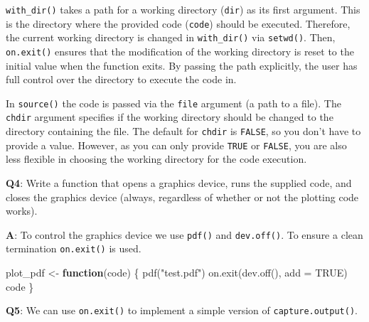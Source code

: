 \documentclass[
]{krantz}
\makeatletter
\newenvironment{Shaded}{\begin{snugshade}}{\end{snugshade}}
\newcommand{\ControlFlowTok}[1]{\textcolor[rgb]{0.13,0.29,0.53}{\textbf{#1}}}
\newcommand{\DataTypeTok}[1]{\textcolor[rgb]{0.13,0.29,0.53}{#1}}
\newcommand{\KeywordTok}[1]{\textcolor[rgb]{0.13,0.29,0.53}{\textbf{#1}}}
\newcommand{\NormalTok}[1]{#1}
\newcommand{\OtherTok}[1]{\textcolor[rgb]{0.56,0.35,0.01}{#1}}
\newcommand{\StringTok}[1]{\textcolor[rgb]{0.31,0.60,0.02}{#1}}
\newenvironment{kframe}{%
\medskip{}
\setlength{\fboxsep}{.8em}
 \def\at@end@of@kframe{}%
 \ifinner\ifhmode%
  \def\at@end@of@kframe{\end{minipage}}%
  \begin{minipage}{\columnwidth}%
 \fi\fi%
 \def\FrameCommand##1{\hskip\@totalleftmargin \hskip-\fboxsep
 \colorbox{shadecolor}{##1}\hskip-\fboxsep
     \hskip-\linewidth \hskip-\@totalleftmargin \hskip\columnwidth}%
 \MakeFramed {\advance\hsize-\width
   \@totalleftmargin\z@ \linewidth\hsize
   \@setminipage}}%
 {\par\unskip\endMakeFramed%
 \at@end@of@kframe}
\renewenvironment{Shaded}{\begin{kframe}}{\end{kframe}}
\renewcommand{\KeywordTok} [1]{\textcolor[rgb]{0.00,0.44,0.13}{{#1}}}
\renewcommand{\DataTypeTok}[1]{\textcolor[rgb]{0.56,0.13,0.00}{{#1}}}
\renewcommand{\StringTok}  [1]{\textcolor[rgb]{0.25,0.44,0.63}{{#1}}}
\renewcommand{\OtherTok}   [1]{\textcolor[rgb]{0.00,0.44,0.13}{{#1}}}
\renewcommand{\NormalTok}  [1]{{#1}}
\makeatother
\begin{document}
\texttt{with\_dir()} takes a path for a working directory (\texttt{dir}) as its first argument. This is the directory where the provided code (\texttt{code}) should be executed. Therefore, the current working directory is changed in \texttt{with\_dir()} via \texttt{setwd()}. Then, \texttt{on.exit()} ensures that the modification of the working directory is reset to the initial value when the function exits. By passing the path explicitly, the user has full control over the directory to execute the code in.

In \texttt{source()} the code is passed via the \texttt{file} argument (a path to a file). The \texttt{chdir} argument specifies if the working directory should be changed to the directory containing the file. The default for \texttt{chdir} is \texttt{FALSE}, so you don't have to provide a value. However, as you can only provide \texttt{TRUE} or \texttt{FALSE}, you are also less flexible in choosing the working directory for the code execution.

\textbf{{Q4}}: Write a function that opens a graphics device, runs the supplied code, and closes the graphics device (always, regardless of whether or not the plotting code works).

\textbf{{A}}: To control the graphics device we use \texttt{pdf()} and \texttt{dev.off()}. To ensure a clean termination \texttt{on.exit()} is used.

\begin{Shaded}
\begin{Highlighting}[]
\NormalTok{plot_pdf <-}\StringTok{ }\ControlFlowTok{function}\NormalTok{(code) \{}
  \KeywordTok{pdf}\NormalTok{(}\StringTok{"test.pdf"}\NormalTok{)}
  \KeywordTok{on.exit}\NormalTok{(}\KeywordTok{dev.off}\NormalTok{(), }\DataTypeTok{add =} \OtherTok{TRUE}\NormalTok{)}
\NormalTok{  code}
\NormalTok{\}}
\end{Highlighting}
\end{Shaded}

\textbf{{Q5}}: We can use \texttt{on.exit()} to implement a simple version of \texttt{capture.output()}.
\end{document}
